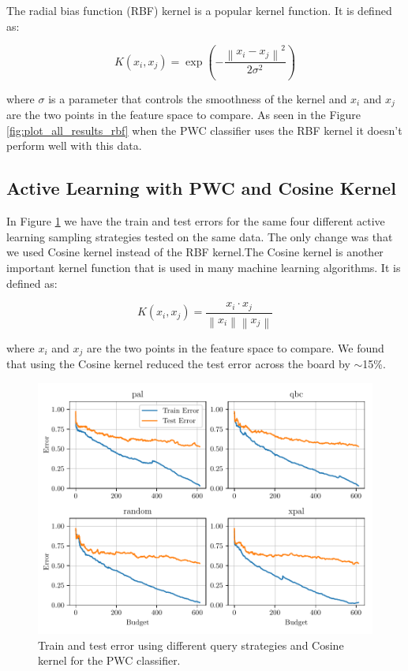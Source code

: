 The radial bias function (RBF) kernel is a popular kernel function. It is defined as:

\begin{equation}
    K(x_i, x_j) = \exp\left(- \frac{\left\| x_i - x_j \right\|^2}{2 \sigma^2}\right)
\label{eq:rbf_kernel}
\end{equation}

where $\sigma$ is a parameter that controls the smoothness of the kernel and $x_i$ and $x_j$ are the two points in the feature space to compare. As seen in the Figure \ref{fig:plot_all_results_rbf} when the PWC classifier uses the RBF kernel it doesn't perform well with this data.

\subsection{Active Learning with PWC and Cosine Kernel}

In Figure \ref{fig:plot_all_results_cosine} we have the train and test errors for the same four different active learning sampling strategies tested on the same data. The only change was that we used Cosine kernel instead of the RBF kernel.The Cosine kernel is another important kernel function that is used in many machine learning algorithms. It is defined as:

\begin{equation}
    K(x_i, x_j) = \frac{x_i \cdot x_j}{\left\| x_i \right\| \left\| x_j \right\|}
\label{eq:cosine_kernel}
\end{equation}

where $x_i$ and $x_j$ are the two points in the feature space to compare. We found that using the Cosine kernel reduced the test error across the board by $\sim$15\%.  

\begin{figure}[ht]
  \centering
  \includegraphics[width=\textwidth]{../img/plot_all_results_cosine.pdf}
  \caption{Train and test error using different query strategies and Cosine kernel for the PWC classifier.}
  \label{fig:plot_all_results_cosine}
\end{figure}


